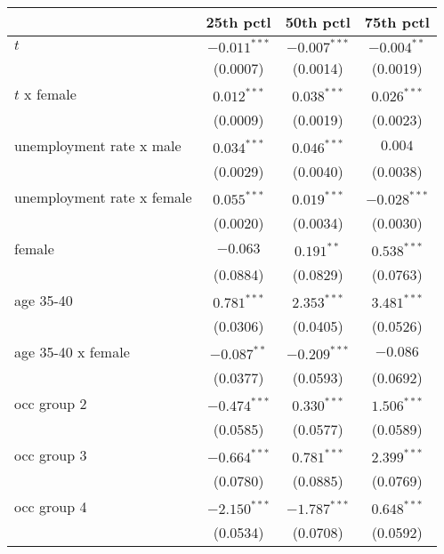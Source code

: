 \begin{tabular}{l|ccc|}
\toprule
{} &       25th pctl &       50th pctl &       75th pctl \\
\midrule
$t$                        &  $-0.011^{***}$ &  $-0.007^{***}$ &   $-0.004^{**}$ \\
                           &        (0.0007) &        (0.0014) &        (0.0019) \\
$t$ x female               &   $0.012^{***}$ &   $0.038^{***}$ &   $0.026^{***}$ \\
                           &        (0.0009) &        (0.0019) &        (0.0023) \\
unemployment rate x male   &   $0.034^{***}$ &   $0.046^{***}$ &         $0.004$ \\
                           &        (0.0029) &        (0.0040) &        (0.0038) \\
unemployment rate x female &   $0.055^{***}$ &   $0.019^{***}$ &  $-0.028^{***}$ \\
                           &        (0.0020) &        (0.0034) &        (0.0030) \\
female                     &        $-0.063$ &    $0.191^{**}$ &   $0.538^{***}$ \\
                           &        (0.0884) &        (0.0829) &        (0.0763) \\
age 35-40                  &   $0.781^{***}$ &   $2.353^{***}$ &   $3.481^{***}$ \\
                           &        (0.0306) &        (0.0405) &        (0.0526) \\
age 35-40 x female         &   $-0.087^{**}$ &  $-0.209^{***}$ &        $-0.086$ \\
                           &        (0.0377) &        (0.0593) &        (0.0692) \\
occ group 2                &  $-0.474^{***}$ &   $0.330^{***}$ &   $1.506^{***}$ \\
                           &        (0.0585) &        (0.0577) &        (0.0589) \\
occ group 3                &  $-0.664^{***}$ &   $0.781^{***}$ &   $2.399^{***}$ \\
                           &        (0.0780) &        (0.0885) &        (0.0769) \\
occ group 4                &  $-2.150^{***}$ &  $-1.787^{***}$ &   $0.648^{***}$ \\
                           &        (0.0534) &        (0.0708) &        (0.0592) \\

\end{tabular}
